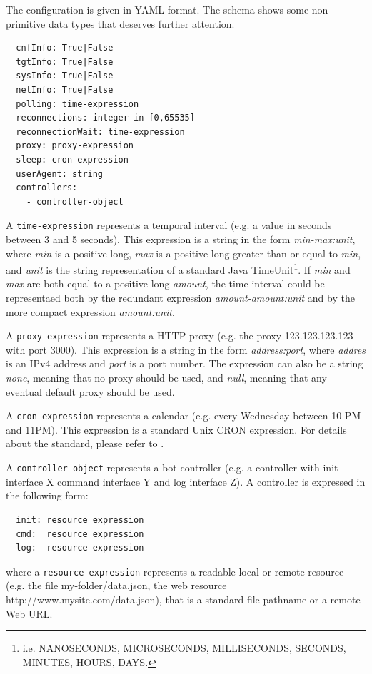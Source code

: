 The configuration is given in YAML format. The schema shows some non primitive data types that deserves further attention.

\begin{verbatim}
  cnfInfo: True|False
  tgtInfo: True|False
  sysInfo: True|False
  netInfo: True|False
  polling: time-expression
  reconnections: integer in [0,65535]
  reconnectionWait: time-expression
  proxy: proxy-expression
  sleep: cron-expression
  userAgent: string
  controllers:
    - controller-object
\end{verbatim}

A \texttt{time-expression} represents a temporal interval (e.g. a value in seconds between 3 and 5 seconds). This expression is a string in the form \textit{min-max:unit}, where \textit{min} is a positive long, \textit{max} is a positive long greater than or equal to \textit{min}, and \textit{unit} is the string representation of a standard Java TimeUnit\footnote{i.e. NANOSECONDS, MICROSECONDS, MILLISECONDS, SECONDS, MINUTES, HOURS, DAYS.}. If \textit{min} and \textit{max} are both equal to a positive long \textit{amount}, the time interval could be representaed both by the redundant expression \textit{amount-amount:unit} and by the more compact expression \textit{amount:unit}.

A \texttt{proxy-expression} represents a HTTP proxy (e.g. the proxy 123.123.123.123 with port 3000). This expression is a string in the form \textit{address:port}, where \textit{addres} is an IPv4 address and \textit{port} is a port number. The expression can also be a string \textit{none}, meaning that no proxy should be used, and \textit{null}, meaning that any eventual default proxy should be used.

A \texttt{cron-expression} represents a calendar (e.g. every Wednesday between 10 PM and 11PM). This expression is a standard Unix CRON expression. For details about the standard, please refer to \cite{cron-expression}.

A \texttt{controller-object} represents a bot controller (e.g. a controller with init interface X command interface Y and log interface Z). A controller is expressed in the following form:

\begin{verbatim}
  init: resource expression
  cmd:  resource expression
  log:  resource expression
\end{verbatim}

where a \texttt{resource expression} represents a readable local or remote resource (e.g. the file my-folder/data.json, the web resource http://www.mysite.com/data.json), that is a standard file pathname or a remote Web URL.

